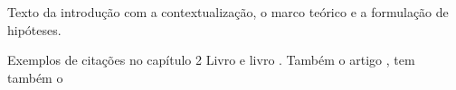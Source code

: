 
Texto da introdução com a contextualização, o marco teórico e a formulação de hipóteses.

Exemplos de cita\c{c}\~{o}es no cap\'{i}tulo 2
Livro \cite{demeyer2008} e  livro \cite{raymond1999}. Tamb\'{e}m o artigo \cite{zhang2015}, tem também o \cite{panozzo2015}

